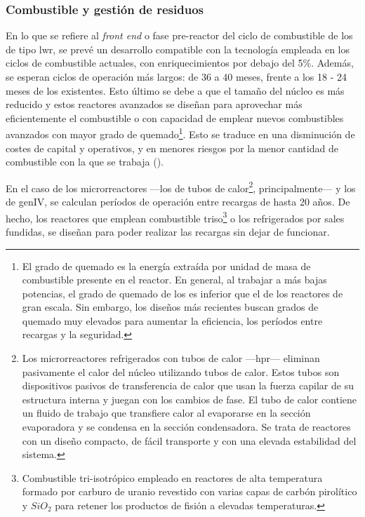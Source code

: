 \newpage
\subsubsection{Combustible y gestión de residuos} \label{combustible}

En lo que se refiere al \emph{front end} o fase pre-reactor del ciclo de combustible de los  de tipo \acrshort{lwr}, se prevé un desarrollo compatible con la tecnología empleada en los ciclos de combustible actuales, con enriquecimientos  por debajo del 5\%. Además, se esperan ciclos de operación más largos: de 36 a 40 meses, frente a los 18 - 24 meses de los  existentes. Esto último se debe a que el tamaño del núcleo es más reducido y estos reactores avanzados se diseñan para aprovechar más eficientemente el combustible o con capacidad de emplear nuevos combustibles avanzados con mayor \gls{grado de quemado}\footnote{El grado de quemado es la energía extraída por unidad de masa de combustible presente en el reactor. En general, al trabajar a más bajas potencias, el grado de quemado de los  es inferior que el de los reactores de gran escala. Sin embargo, los diseños más recientes buscan grados de quemado muy elevados para aumentar la eficiencia, los períodos entre recargas y la seguridad.}. Esto se traduce en una disminución de costes de capital y operativos, y en menores riesgos por la menor cantidad de combustible con la que se trabaja (\cite{overview_smrs}).

En el caso de los microrreactores ---los de \gls{tubos de calor}\footnote{Los microrreactores refrigerados con tubos de calor ---\acrfull{hpr}--- eliminan pasivamente el calor del núcleo  utilizando tubos de calor. Estos tubos son dispositivos pasivos de transferencia de calor que usan la fuerza capilar de su estructura interna y juegan con los cambios de fase. El tubo de calor contiene un fluido de trabajo que transfiere calor al evaporarse en la sección evaporadora y se condensa en la sección condensadora. Se trata de reactores con un diseño compacto, de fácil transporte y con una elevada estabilidad del sistema.}, principalmente--- y los  de \acrshort{genIV}, se calculan períodos de operación entre recargas de hasta 20 años. De hecho, los reactores que emplean \gls{combustible} \acrshort{triso}\footnote{Combustible tri-isotrópico empleado en reactores de alta temperatura formado por carburo de uranio revestido con varias capas de carbón pirolítico y $SiO_2$ para retener los productos de fisión a elevadas temperaturas.} o los refrigerados por sales fundidas, se diseñan para poder realizar las recargas sin dejar de funcionar.

